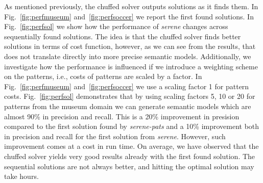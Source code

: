 \documentclass[letterpaper]{article} %
\begin{document}
As mentioned previously, the chuffed solver outputs solutions as it finds them.
In Fig.~\ref{fig:perfmuseum} and~\ref{fig:perfsoccer} we report the first found solutions.
In Fig.~\ref{fig:perfsol} we show how the performance of \emph{serene} changes across sequentially found solutions.
The idea is that the chuffed solver finds better solutions in terms of cost function, however, as we can see from the results,
that does not translate directly into more precise semantic models.
Additionally, we investigate how the performance is influenced if we introduce a weighting scheme on the patterns,
i.e., costs of patterns are scaled by a factor.
In Fig.~\ref{fig:perfmuseum} and~\ref{fig:perfsoccer} we use a scaling factor 1 for pattern costs.
Fig.~\ref{fig:perfsol} demonstrates that by using scaling factors 5, 10 or 20 for patterns from the museum domain we can generate semantic models which are almost 90\% in precision and recall.
This is a 20\% improvement in presision compared to the first solution found by \emph{serene-pats} and a 10\% improvement both in precision and recall for the first solution from \emph{serene}.
However, such improvement comes at a cost in run time.
On average, we have observed that the chuffed solver yields very good results already with the first found solution.
The sequential solutions are not always better, and hitting the optimal solution may take hours.
\end{document}
